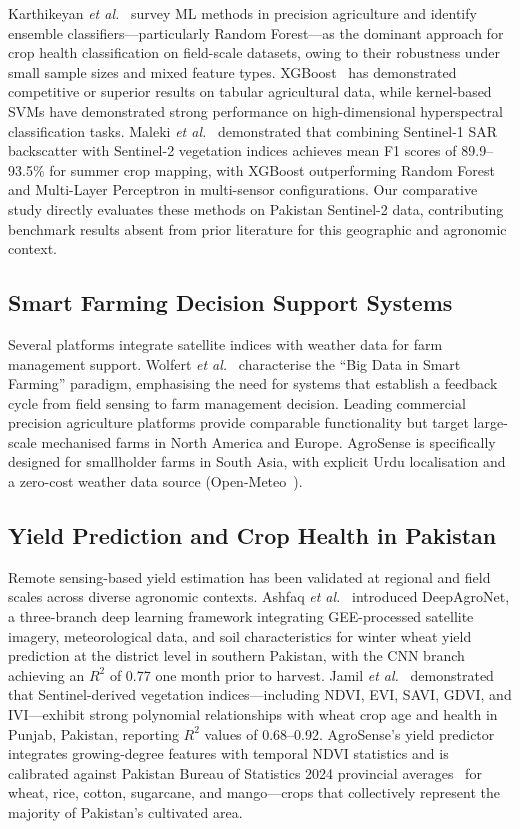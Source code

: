 \documentclass[conference]{IEEEtran}
\begin{document}
Karthikeyan \textit{et al.}~\cite{karthikeyan2020} survey ML methods in
precision agriculture and identify ensemble classifiers---particularly Random
Forest---as the dominant approach for crop health classification on field-scale
datasets, owing to their robustness under small sample sizes and mixed feature
types. XGBoost~\cite{chen2016xgboost} has demonstrated competitive or superior
results on tabular agricultural data, while kernel-based SVMs have demonstrated
strong performance on high-dimensional hyperspectral classification tasks.
Maleki \textit{et al.}~\cite{maleki2024} demonstrated that combining
Sentinel-1 SAR backscatter with Sentinel-2 vegetation indices achieves mean F1
scores of 89.9--93.5\% for summer crop mapping, with XGBoost outperforming
Random Forest and Multi-Layer Perceptron in multi-sensor configurations. Our
comparative study directly evaluates these methods on Pakistan Sentinel-2 data,
contributing benchmark results absent from prior literature for this geographic
and agronomic context.

\subsection{Smart Farming Decision Support Systems}

Several platforms integrate satellite indices with weather data for farm
management support. Wolfert \textit{et al.}~\cite{wolfert2017} characterise the
``Big Data in Smart Farming'' paradigm, emphasising the need for systems that
establish a feedback cycle from field sensing to farm management decision.
Leading commercial precision agriculture platforms provide comparable
functionality but target large-scale mechanised farms in North America and
Europe. AgroSense is specifically designed for smallholder farms in South Asia,
with explicit Urdu localisation and a zero-cost weather data source
(Open-Meteo~\cite{zippenfenig2023}).

\subsection{Yield Prediction and Crop Health in Pakistan}

Remote sensing-based yield estimation has been validated at regional and field
scales across diverse agronomic contexts. Ashfaq \textit{et
al.}~\cite{ashfaq2025} introduced DeepAgroNet, a three-branch deep learning
framework integrating GEE-processed satellite imagery, meteorological data, and
soil characteristics for winter wheat yield prediction at the district level in
southern Pakistan, with the CNN branch achieving an $R^2$ of 0.77 one month
prior to harvest. Jamil \textit{et al.}~\cite{jamil2025} demonstrated that
Sentinel-derived vegetation indices---including NDVI, EVI, SAVI, GDVI, and
IVI---exhibit strong polynomial relationships with wheat crop age and health in
Punjab, Pakistan, reporting $R^2$ values of 0.68--0.92. AgroSense's yield
predictor integrates growing-degree features with temporal NDVI statistics and
is calibrated against Pakistan Bureau of Statistics 2024 provincial
averages~\cite{pbs2024} for wheat, rice, cotton, sugarcane, and mango---crops
that collectively represent the majority of Pakistan's cultivated area.
\end{document}
